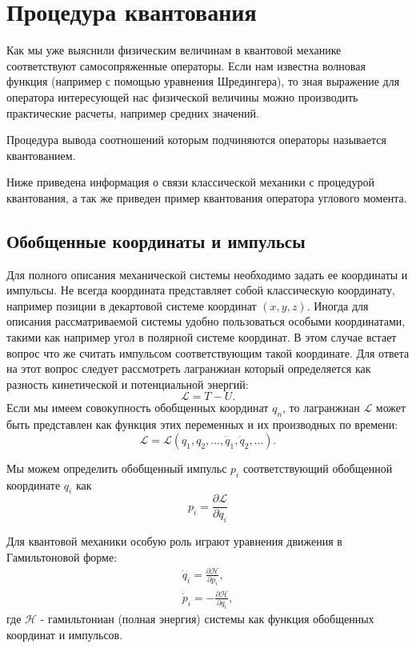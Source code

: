 \section{Процедура квантования}
Как мы уже выяснили физическим величинам в квантовой механике
соответствуют самосопряженные операторы. Если нам известна волновая
функция (например с помощью уравнения Шредингера), то зная выражение
для оператора интересующей нас физической величины можно производить
практические расчеты, например средних значений.

Процедура вывода соотношений которым подчиняются операторы называется
квантованием. 

Ниже приведена информация о связи классической механики с процедурой
квантования, а так же приведен пример квантования оператора углового
момента.

\subsection{Обобщенные координаты и импульсы}

Для полного описания механической системы необходимо задать ее
координаты и импульсы. Не всегда координата представляет собой
классическую координату, например позиции в декартовой системе
координат $(x,y,z)$. Иногда для описания рассматриваемой системы
удобно пользоваться особыми координатами, такими как например угол в
полярной системе координат. В этом случае встает вопрос что же считать
импульсом соответствующим такой координате. Для ответа на этот вопрос
следует рассмотреть лагранжиан который определяется как разность
кинетической и потенциальной энергий:
\[
\mathcal{L} = T - U.
\]
Если мы имеем совокупность обобщенных координат ${q_n}$, то лагранжиан
$\mathcal{L}$ может быть представлен как функция этих переменных и их
производных по времени:
\[
\mathcal{L} = \mathcal{L}\left(q_1, q_2, \dots, \dot{q}_1, \dot{q}_2,
\dots \right).
\]

Мы можем определить обобщенный импульс $p_i$ соответствующий обобщенной
координате $q_i$ как
\[
p_i = \frac{\partial \mathcal{L}}{\partial \dot{q}_i}
\]

Для квантовой механики особую роль играют уравнения движения в
Гамильтоновой форме:
\begin{eqnarray}
\dot{q}_i = \frac{\partial \mathcal{H}}{\partial p_i},
\nonumber \\
\dot{p}_i = - \frac{\partial \mathcal{H}}{\partial q_i},
\label{eq:add:quantel:hamilton}
\end{eqnarray}
где $\mathcal{H}$ - гамильтониан (полная энергия) системы как функция
обобщенных координат и импульсов.


